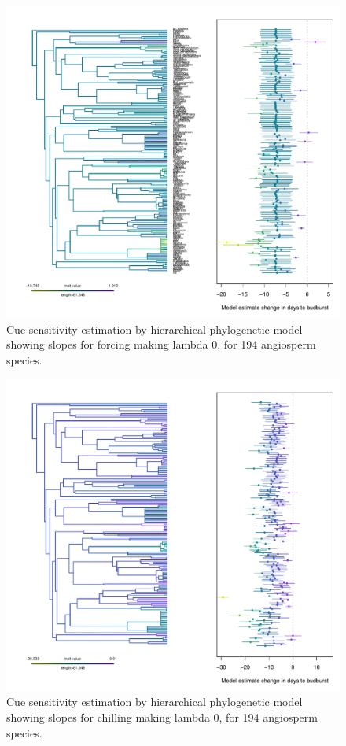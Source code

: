 \documentclass{article}\usepackage[]{graphicx}\usepackage[]{color}
\begin{document}
\begin{figure} [H]
  \begin{center}
  \includegraphics[width=14cm]{..//..//analyses/phylogeny/figures/muplot_phylo_force_lambda0.pdf}
  \caption{Cue sensitivity estimation by hierarchical phylogenetic model showing slopes for forcing making lambda \= 0, for 194 angiosperm species.}
  \label{fig:muplot_force_lambda0}
  \end{center}
\end{figure}

\begin{figure} [H]
  \begin{center}
  \includegraphics[width=14cm]{..//..//analyses/phylogeny/figures/muplot_phylo_chilll_lambda0.pdf}
  \caption{Cue sensitivity estimation by hierarchical phylogenetic model showing slopes for chilling making lambda \= 0, for 194 angiosperm species.}
  \label{fig:muplot_chill_lambda0}
  \end{center}
\end{figure}
\end{document}
